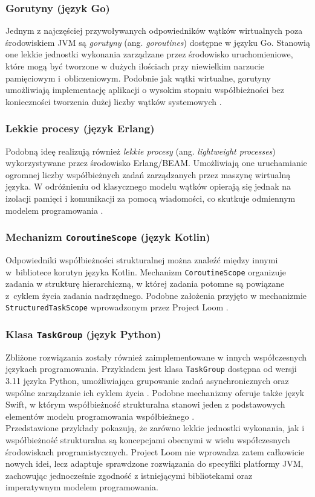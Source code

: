 \subsubsection{Gorutyny (język Go)}
Jednym z najczęściej przywoływanych odpowiedników wątków wirtualnych poza środowiskiem JVM są \emph{gorutyny} (ang. \emph{goroutines}) dostępne w języku Go. Stanowią one lekkie jednostki wykonania zarządzane przez środowisko uruchomieniowe, które mogą być tworzone w dużych ilościach przy niewielkim narzucie pamięciowym i~obliczeniowym. Podobnie jak wątki wirtualne, gorutyny umożliwiają implementację aplikacji o wysokim stopniu współbieżności bez konieczności tworzenia dużej liczby wątków systemowych \cite{go-concurrency-patterns}.

\subsubsection{Lekkie procesy (język Erlang)}
Podobną ideę realizują również \emph{lekkie procesy} (ang. \emph{lightweight processes}) wykorzystywane przez środowisko Erlang/BEAM. Umożliwiają one uruchamianie ogromnej liczby współbieżnych zadań zarządzanych przez maszynę wirtualną języka. W odróżnieniu od klasycznego modelu wątków opierają się jednak na izolacji pamięci i komunikacji za pomocą wiadomości, co skutkuje odmiennym modelem programowania \cite{armstrong2007}.

\subsubsection{Mechanizm \texttt{CoroutineScope} (język Kotlin)}
Odpowiedniki współbieżności strukturalnej można znaleźć między innymi w~bibliotece korutyn języka Kotlin. Mechanizm \texttt{CoroutineScope} organizuje zadania w strukturę hierarchiczną, w której zadania potomne są powiązane z~cyklem życia zadania nadrzędnego. Podobne założenia przyjęto w mechanizmie \texttt{StructuredTaskScope} wprowadzonym przez Project Loom \cite{kotlin-coroutinescope-docs}.

\subsubsection{Klasa \texttt{TaskGroup} (język Python)}
Zbliżone rozwiązania zostały również zaimplementowane w innych współczesnych językach programowania. Przykładem jest klasa \texttt{TaskGroup} dostępna od wersji 3.11 języka Python, umożliwiająca grupowanie zadań asynchronicznych oraz wspólne zarządzanie ich cyklem życia \cite{python-taskgroup}. Podobne mechanizmy oferuje także język Swift, w którym współbieżność strukturalna stanowi jeden z podstawowych elementów modelu programowania współbieżnego \cite{swift-structured-concurrency}.\\[1em]

Przedstawione przykłady pokazują, że zarówno lekkie jednostki wykonania, jak i współbieżność strukturalna są koncepcjami obecnymi w wielu współczesnych środowiskach programistycznych. Project Loom nie wprowadza zatem całkowicie nowych idei, lecz adaptuje sprawdzone rozwiązania do specyfiki platformy JVM, zachowując jednocześnie zgodność z istniejącymi bibliotekami oraz imperatywnym modelem programowania.